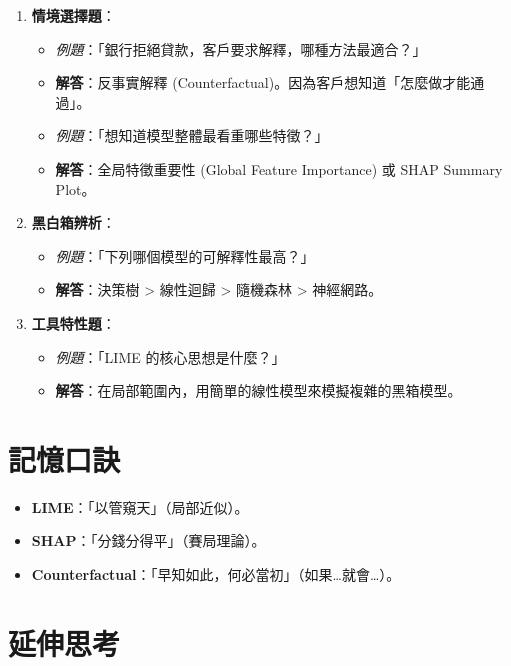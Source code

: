 \documentclass[
  letterpaper,
  DIV=11,
  numbers=noendperiod]{scrreprt}
\providecommand{\tightlist}{%
  \setlength{\itemsep}{0pt}\setlength{\parskip}{0pt}}
\begin{document}
\begin{enumerate}
\def\labelenumi{\arabic{enumi}.}
\tightlist
\item
  \textbf{情境選擇題}：

  \begin{itemize}
  \tightlist
  \item
    \emph{例題}：「銀行拒絕貸款，客戶要求解釋，哪種方法最適合？」
  \item
    \textbf{解答}：反事實解釋
    (Counterfactual)。因為客戶想知道「怎麼做才能通過」。
  \item
    \emph{例題}：「想知道模型整體最看重哪些特徵？」
  \item
    \textbf{解答}：全局特徵重要性 (Global Feature Importance) 或 SHAP
    Summary Plot。
  \end{itemize}
\item
  \textbf{黑白箱辨析}：

  \begin{itemize}
  \tightlist
  \item
    \emph{例題}：「下列哪個模型的可解釋性最高？」
  \item
    \textbf{解答}：決策樹 \textgreater{} 線性迴歸 \textgreater{}
    隨機森林 \textgreater{} 神經網路。
  \end{itemize}
\item
  \textbf{工具特性題}：

  \begin{itemize}
  \tightlist
  \item
    \emph{例題}：「LIME 的核心思想是什麼？」
  \item
    \textbf{解答}：在局部範圍內，用簡單的線性模型來模擬複雜的黑箱模型。
  \end{itemize}
\end{enumerate}

\section{記憶口訣}\label{ux8a18ux61b6ux53e3ux8a23-9}

\begin{itemize}
\tightlist
\item
  \textbf{LIME}：「以管窺天」（局部近似）。
\item
  \textbf{SHAP}：「分錢分得平」（賽局理論）。
\item
  \textbf{Counterfactual}：「早知如此，何必當初」（如果\ldots 就會\ldots）。
\end{itemize}

\section{延伸思考}\label{ux5ef6ux4f38ux601dux8003-9}
\end{document}
